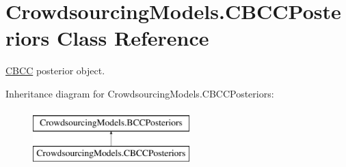 \hypertarget{class_crowdsourcing_models_1_1_c_b_c_c_posteriors}{}\section{Crowdsourcing\+Models.\+C\+B\+C\+C\+Posteriors Class Reference}
\label{class_crowdsourcing_models_1_1_c_b_c_c_posteriors}


\hyperlink{class_crowdsourcing_models_1_1_c_b_c_c}{C\+B\+C\+C} posterior object.  


Inheritance diagram for Crowdsourcing\+Models.\+C\+B\+C\+C\+Posteriors\+:\begin{figure}[H]
\begin{center}
\leavevmode
\includegraphics[height=2.000000cm]{class_crowdsourcing_models_1_1_c_b_c_c_posteriors}
\end{center}
\end{figure}
